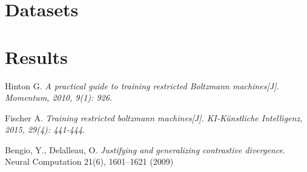\documentclass[a4paper,10pt]{article}
\newcommand{\todo}[1]{\textcolor{red}{TODO: #1}\PackageWarning{TODO:}{#1!}}
\begin{document}
\section{Datasets}


\section{Results}



\begin{thebibliography}{9}
	\setlength{\parskip}{0pt} 
	
	 Hinton G. \textit{ A practical guide to training restricted Boltzmann machines[J]. Momentum, 2010, 9(1): 926.}
	
	 Fischer A. \textit{Training restricted boltzmann machines[J]. KI-Künstliche Intelligenz, 2015, 29(4): 441-444.}

	  Bengio, Y., Delalleau, O. \textit{Justifying and generalizing contrastive divergence}. Neural Computation 21(6), 1601–1621 (2009)
	
\end{thebibliography}
\end{document}
